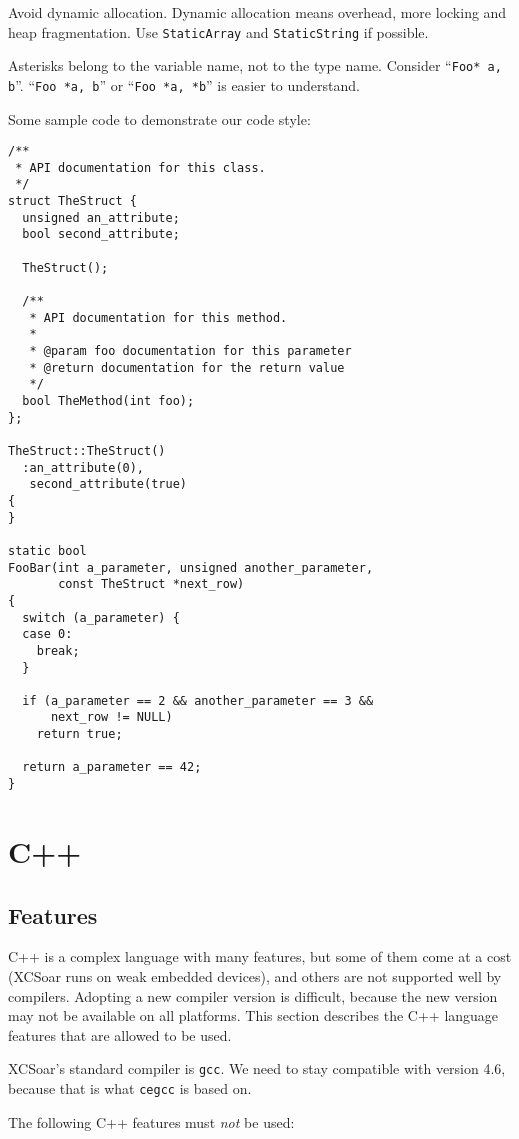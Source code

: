 \documentclass[a4paper,12pt]{refrep}
\begin{document}
Avoid dynamic allocation.  Dynamic allocation means overhead, more
locking and heap fragmentation.  Use \texttt{StaticArray} and
\texttt{StaticString} if possible.

Asterisks belong to the variable name, not to the type name.  Consider
``\texttt{Foo* a, b}''.  ``\texttt{Foo *a, b}'' or ``\texttt{Foo *a,
  *b}'' is easier to understand.

Some sample code to demonstrate our code style:

\begin{verbatim}
/**
 * API documentation for this class.
 */
struct TheStruct {
  unsigned an_attribute;
  bool second_attribute;

  TheStruct();

  /**
   * API documentation for this method.
   *
   * @param foo documentation for this parameter
   * @return documentation for the return value
   */
  bool TheMethod(int foo);
};

TheStruct::TheStruct()
  :an_attribute(0),
   second_attribute(true)
{
}

static bool
FooBar(int a_parameter, unsigned another_parameter,
       const TheStruct *next_row)
{
  switch (a_parameter) {
  case 0:
    break;
  }

  if (a_parameter == 2 && another_parameter == 3 &&
      next_row != NULL)
    return true;

  return a_parameter == 42;
}
\end{verbatim}

\section{C++}

\subsection{Features}

C++ is a complex language with many features, but some of them come at
a cost (XCSoar runs on weak embedded devices), and others are not
supported well by compilers.  Adopting a new compiler version is
difficult, because the new version may not be available on all
platforms.  This section describes the C++ language features that are
allowed to be used.

XCSoar's standard compiler is \texttt{gcc}.  We need to stay
compatible with version 4.6, because that is what \texttt{cegcc} is
based on.

The following C++ features must \emph{not} be used:
\end{document}

